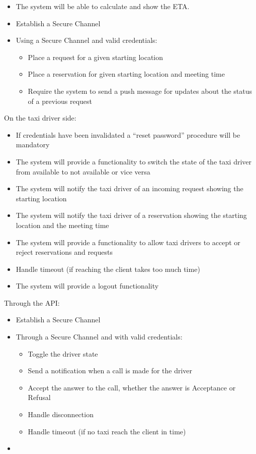\documentclass{article}
\begin{document}
\begin{itemize}
\begin{itemize}
			\item The system will be able to calculate and show the ETA.\@ 
			\item Establish a Secure Channel 
			\item Using a Secure Channel and valid credentials:\@
				\begin{itemize}
					\item Place a request for a given starting location
					\item Place a reservation for given starting location and meeting time
					\item Require the system to send a push message for updates about the status of a previous request
				\end{itemize}
		\end{itemize}
\end{itemize}
On the taxi driver side:\@ 
\begin{itemize}
	\item If credentials have been invalidated a ``reset password'' procedure will be mandatory %
	\item The system will provide a functionality to switch the state of the taxi driver from available to not available or vice versa
	\item The system will notify the taxi driver of an incoming request showing the starting location
	\item The system will notify the taxi driver of a reservation showing the starting location and the meeting time
	\item The system will provide a functionality to allow taxi drivers to accept or reject reservations and requests
	\item Handle timeout (if reaching the client takes too much time) %
	\item The system will provide a logout functionality
\end{itemize}
Through the API:\@ %
		\begin{itemize}
			\item Establish a Secure Channel
			\item Through a Secure Channel and with valid credentials:\@
				\begin{itemize}
					\item Toggle the driver state
					\item Send a notification when a call is made for the driver
					\item Accept the answer to the call, whether the answer is Acceptance or Refusal
					\item Handle disconnection
					\item Handle timeout (if no taxi reach the client in time)
				\end{itemize}
			\item 
		\end{itemize}
\end{document}
